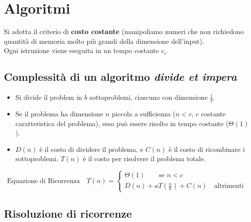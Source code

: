 \documentclass[10pt,a4paper]{article}
\begin{document}
\vfill

\section*{Algoritmi}

Si adotta il criterio di \textbf{costo costante} (manipoliamo numeri che non richiedono quantit\`a di memoria molto pi\`u grandi della dimensione dell'input). \\
Ogni istruzione viene eseguita in un tempo costante $c_i$.

\subsection*{Complessit\`a di un algoritmo \textit{divide et impera}}
\begin{itemize}
    \item Si divide il problem in $b$ sottoproblemi, ciascuno con dimensione $\frac{1}{b}$.
    \item Se il problema ha dimensione $n$ piccola a sufficienza ($n < c$, $c$ costante caratteristica del problema), esso pu\`o essere risolto in tempo costante ($\Theta(1)$).
    \item $D(n)$ \`e il costo di dividere il problema, e $C(n)$ \`e il costo di ricombinare i sottoproblemi. $T(n)$ \`e il costo per risolvere il problema totale.
\end{itemize}
\begin{equation*}
    \text{Equazione di Ricorrenza} \quad T(n) = 
    \begin{cases}
        \Theta(1) \qquad \text{se } n < c\\
        D(n) + aT(\frac{n}{b}) + C(n) \quad  \text{altrimenti}
    \end{cases}
\end{equation*}

\pagebreak

\subsection*{Risoluzione di ricorrenze}
\end{document}
